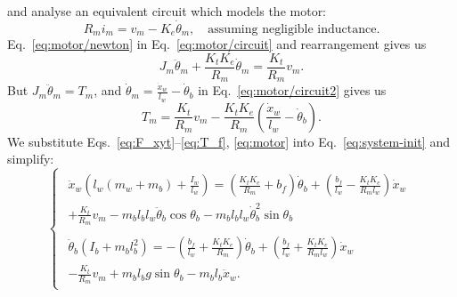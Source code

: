 \documentclass[11pt]{article} %
\begin{document}
and analyse an equivalent circuit which models the motor:
\begin{equation}\label{eq:motor/circuit}
R_m i_m = v_m - K_e \dot{\theta}_m, \quad \text{assuming negligible inductance.}
\end{equation}
Eq.~\eqref{eq:motor/newton} in Eq.~\eqref{eq:motor/circuit} and rearrangement gives us
\begin{equation}\label{eq:motor/circuit2}
  J_m \ddot{\theta}_m
  + \frac{K_t K_e}{R_m} \dot{\theta}_m
  = \frac{K_t}{R_m}v_m.
\end{equation}
But $J_m \ddot{\theta}_m = T_m$, and $\dot{\theta}_m = \frac{\dot{x}_w}{l_w} - \dot{\theta}_b$ in Eq.~\eqref{eq:motor/circuit2} gives us
\begin{equation}\label{eq:motor}
  T_m = \frac{K_t}{R_m}v_m -
  \frac{K_t K_e}{R_m}\left(
    \frac{\dot{x}_w}{l_w}
    - \dot{\theta}_b
  \right).
\end{equation}
We substitute Eqs.~\eqref{eq:F_xyt}--\eqref{eq:T_f}, \eqref{eq:motor} into Eq.~\eqref{eq:system-init} and simplify:
\begin{equation}\label{eq:system}
  \begin{cases}
    \begin{aligned}
      \ddot{x}_w\left(l_w(m_w + m_b) + \frac{I_w}{l_w}\right) =
      \left(
        \frac{K_t K_e}{R_m}
        + b_f
      \right)\dot{\theta}_b
      +
      \left(
        \frac{b_f}{l_w}
        -
        \frac{K_t K_e}{R_m l_w}
      \right)\dot{x}_w
      \\
      + \frac{K_t}{R_m}v_m
      - m_b l_b l_w \ddot{\theta}_b \cos\theta_b
      - m_b l_b l_w \dot{\theta}_b^2 \sin\theta_b
    \end{aligned}\\
    \begin{aligned}
      \ddot{\theta}_b\left(I_b + m_b l_b^2\right)
      =
      -\left(
        \frac{b_f}{l_w}
        +
        \frac{K_t K_e}{R_m}
      \right)\dot{\theta}_b
      + \left(
        \frac{b_f}{l_w} + \frac{K_t K_e}{R_m l_w}
      \right)\dot{x}_w
      \\
      - \frac{K_t}{R_m}v_m
      + m_b l_b g \sin\theta_b
      - m_b l_b \ddot{x}_w.
    \end{aligned}
  \end{cases}
\end{equation}
\end{document}
